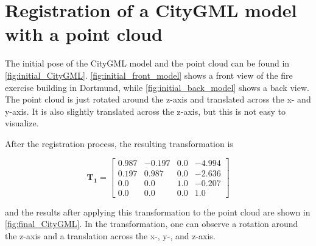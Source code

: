     \section{Registration of a CityGML model with a point cloud}
        The initial pose of the CityGML model and the point cloud can be found in \autoref{fig:initial_CityGML}.
        \autoref{fig:initial_front_model} shows a front view of the fire exercise building in Dortmund, while \autoref{fig:initial_back_model} shows a back view.
        The point cloud is just rotated around the z-axis and translated across the x- and y-axis.
        It is also slightly translated across the z-axis, but this is not easy to visualize.

        After the registration process, the resulting transformation is

        \begin{equation*}
            \pmb{T_1} = 
            \begin{bmatrix}0.987 & -0.197 & 0.0 & -4.994 \\ 
                0.197 & 0.987 & 0.0 & -2.636 \\
                0.0 & 0.0 & 1.0 & -0.207 \\
                0.0 & 0.0 & 0.0 & 1.0
            \end{bmatrix}
        \end{equation*}

        and the results after applying this transformation to the point cloud are shown in \autoref{fig:final_CityGML}.
        In the transformation, one can observe a rotation around the z-axis and a translation across the x-, y-, and z-axis.

